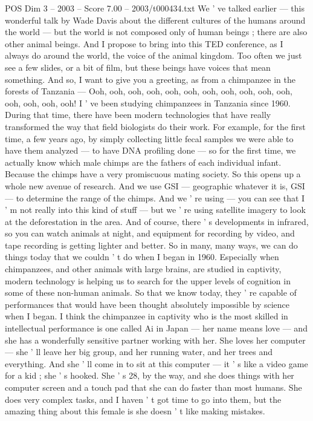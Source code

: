\begin{textsample}{POS Dim 3 – 2003 – Score 7.00 – 2003/t000434.txt}
We ' ve talked earlier — this wonderful talk by Wade Davis about the different cultures of the humans around the world — but the world is not composed only of human beings ; there are also other animal beings.
And I propose to bring into this TED conference, as I always do around the world, the voice of the animal kingdom.
Too often we just see a few slides, or a bit of film, but these beings have voices that mean something.
And so, I want to give you a greeting, as from a chimpanzee in the forests of Tanzania — Ooh, ooh, ooh, ooh, ooh, ooh, ooh, ooh, ooh, ooh, ooh, ooh, ooh, ooh, ooh!
I ' ve been studying chimpanzees in Tanzania since 1960.
During that time, there have been modern technologies that have really transformed the way that field biologists do their work.
For example, for the first time, a few years ago, by simply collecting little fecal samples we were able to have them analyzed — to have DNA profiling done — so for the first time, we actually know which male chimps are the fathers of each individual infant.
Because the chimps have a very promiscuous mating society.
So this opens up a whole new avenue of research.
And we use GSI — geographic whatever it is, GSI — to determine the range of the chimps.
And we ' re using — you can see that I ' m not really into this kind of stuff — but we ' re using satellite imagery to look at the deforestation in the area.
And of course, there ' s developments in infrared, so you can watch animals at night, and equipment for recording by video, and tape recording is getting lighter and better.
So in many, many ways, we can do things today that we couldn ' t do when I began in 1960.
Especially when chimpanzees, and other animals with large brains, are studied in captivity, modern technology is helping us to search for the upper levels of cognition in some of these non-human animals.
So that we know today, they ' re capable of performances that would have been thought absolutely impossible by science when I began.
I think the chimpanzee in captivity who is the most skilled in intellectual performance is one called Ai in Japan — her name means love — and she has a wonderfully sensitive partner working with her.
She loves her computer — she ' ll leave her big group, and her running water, and her trees and everything.
And she ' ll come in to sit at this computer — it ' s like a video game for a kid ; she ' s hooked.
She ' s 28, by the way, and she does things with her computer screen and a touch pad that she can do faster than most humans.
She does very complex tasks, and I haven ' t got time to go into them, but the amazing thing about this female is she doesn ' t like making mistakes.

\end{textsample}
